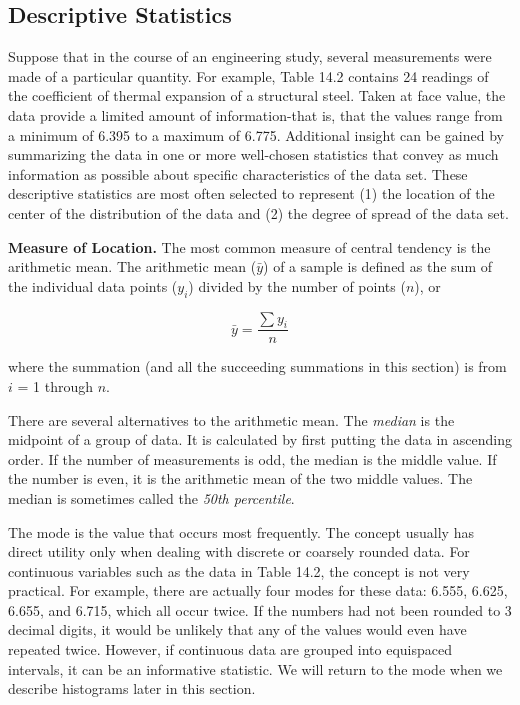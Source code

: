 \documentclass[../main.tex]{subfiles}
\begin{document}
\label{cha:cha_P_14_1_1}
\subsection{Descriptive Statistics}

\noindent Suppose that in the course of an engineering study, several measurements were made of a
particular quantity. For example, Table 14.2 contains 24 readings of the coefficient of thermal expansion of a structural steel. Taken at face value, the data provide a limited amount
of information-that is, that the values range from a minimum of 6.395 to a maximum of
6.775. Additional insight can be gained by summarizing the data in one or more well-chosen statistics that convey as much information as possible about specific characteristics of
the data set. These descriptive statistics are most often selected to represent (1) the location
of the center of the distribution of the data and (2) the degree of spread of the data set.

\noindent \textbf{Measure of Location.} \quad The most common measure of central tendency is the arithmetic
mean. The arithmetic mean ($\bar{y}$) of a sample is defined as the sum of the individual data
points ($y_i$) divided by the number of points ($n$), or

\begin{equation}
	\tag{14.2}
	\bar{y} = \frac{\sum y_i}{n}
\end{equation}

where the summation (and all the succeeding summations in this section) is from $i$ = 1
through $n$.

There are several alternatives to the arithmetic mean. The \textit{median} is the midpoint of a
group of data. It is calculated by first putting the data in ascending order. If the number of
measurements is odd, the median is the middle value. If the number is even, it is the arithmetic mean of the two middle values. The median is sometimes called the \textit{50th percentile}.

The mode is the value that occurs most frequently. The concept usually has direct utility only when dealing with discrete or coarsely rounded data. For continuous variables such
as the data in Table 14.2, the concept is not very practical. For example, there are actually four modes for these data: 6.555, 6.625, 6.655, and 6.715, which all occur twice. If the numbers had not been rounded to 3 decimal digits, it would be unlikely that any of the values
would even have repeated twice. However, if continuous data are grouped into equispaced
intervals, it can be an informative statistic. We will return to the mode when we describe histograms later in this section.
\end{document}
